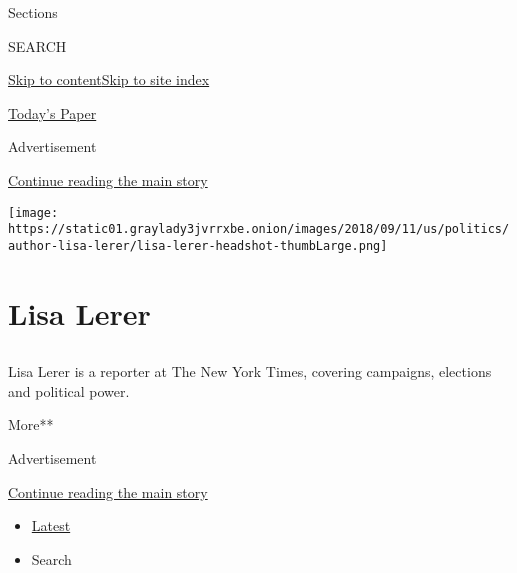 Sections

SEARCH

\protect\hyperlink{site-content}{Skip to
content}\protect\hyperlink{site-index}{Skip to site index}

\href{https://myaccount.nytimes3xbfgragh.onion/auth/login?response_type=cookie\&client_id=vi}{}

\href{https://www.nytimes3xbfgragh.onion/section/todayspaper}{Today's
Paper}

Advertisement

\protect\hyperlink{after-top}{Continue reading the main story}

\texttt{[image: https://static01.graylady3jvrrxbe.onion/images/2018/09/11/us/politics/author-lisa-lerer/lisa-lerer-headshot-thumbLarge.png]}

\hypertarget{lisa-lerer}{%
\section{Lisa Lerer}\label{lisa-lerer}}

\subsection{}

Lisa Lerer is a reporter at The New York Times, covering campaigns,
elections and political power.

More**

Advertisement

\protect\hyperlink{after-mid1}{Continue reading the main story}

\begin{itemize}
\tightlist
\item
  \protect\hyperlink{stream-panel}{Latest}
\item
  Search
\end{itemize}

